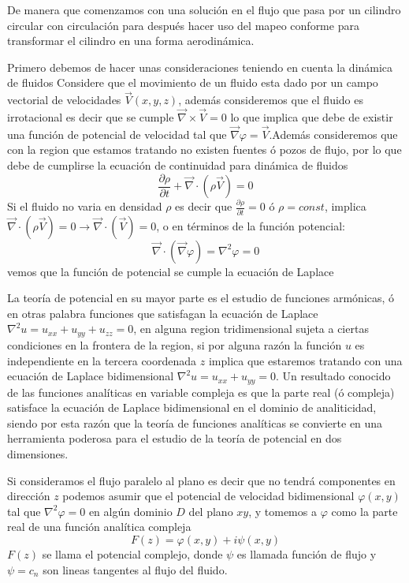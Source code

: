 \documentclass[12pt]{article}
\begin{document}
	De manera que comenzamos con una solución en el flujo que pasa por un cilindro circular con circulación para después hacer uso del mapeo conforme para transformar el cilindro en una forma aerodinámica.	
	
	\noindent Primero debemos de hacer unas consideraciones teniendo en cuenta la dinámica de fluidos Considere que el movimiento de un fluido esta dado por un campo vectorial de velocidades $\vec{V}(x,y,z)$, además consideremos que el fluido es irrotacional es decir que se cumple $\vec{\nabla} \times \vec{V}=0 $ lo que implica que debe de existir una función de potencial de velocidad tal que $\vec{\nabla}\varphi = \vec{V}$.Además consideremos que con la region que estamos tratando no existen fuentes ó pozos de flujo, por lo que debe de cumplirse la ecuación de continuidad para dinámica de fluidos
	\begin{equation}
		\frac{\partial \rho}{\partial t} + \vec{\nabla} \cdotp (\rho \vec{V}) =0		
	\end{equation}
	Si el fluido no varia en densidad $\rho$ es decir que $\frac{\partial \rho}{\partial t} =0 $ ó $\rho = const$, implica $\vec{\nabla} \cdotp (\rho \vec{V}) = 0 \longrightarrow \vec{\nabla} \cdotp (\vec{V}) =0 $, o en términos de la función potencial:
	\begin{equation}
		\vec{\nabla} \cdotp (\vec{\nabla}\varphi) = \nabla^2 \varphi =0 
	\end{equation}	 
	vemos que la función de potencial se cumple la ecuación de Laplace 
	
	\noindent La teoría de potencial	en su mayor parte es el estudio de funciones armónicas, ó en otras palabra funciones que satisfagan la ecuación de Laplace $\nabla^2u = u_{xx} + u_{yy} + u_{zz}= 0 $, en alguna region tridimensional sujeta a ciertas condiciones en la frontera de la region, si por alguna razón la función $u$ es independiente en la tercera coordenada $z$ implica que estaremos tratando con una ecuación de Laplace bidimensional $\nabla^2u = u_{xx} + u_{yy} =0$. Un resultado conocido de las funciones analíticas en variable compleja es que la parte real (ó compleja) satisface la ecuación de Laplace bidimensional en el dominio de analiticidad, siendo por esta razón que la teoría de funciones analíticas se convierte en una herramienta poderosa para el estudio de la teoría de potencial en dos dimensiones.    

	\noindent Si consideramos el flujo paralelo al plano es decir que no tendrá componentes en dirección $z$ podemos asumir que el potencial de velocidad bidimensional  $\varphi(x,y)$ tal que $\nabla^2 \varphi =0 $ en algún dominio $D$ del plano $xy$, y tomemos a $\varphi$ como la parte real de una función analítica compleja
	\begin{equation}
		F(z)=\varphi (x,y)	+ i \psi(x,y)	
	\end{equation}
	$F(z)$ se llama el potencial complejo, donde $\psi$ es llamada  función de flujo y $\psi = c_n$ son lineas tangentes al flujo del fluido.
	
\end{document}
